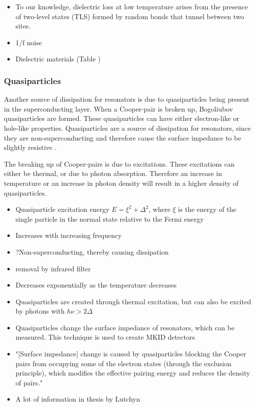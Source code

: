 \documentclass[12pt]{report}
\begin{document}
\begin{itemize}
    \item To our knowledge, dielectric loss at low temperature
        arises from the presence of two-level states (TLS) formed
        by random bonds that tunnel between two sites. \cite{martinis2014ucsb}
    \item 1/f noise \cite{burnett2013evidence}
    \item Dielectric materials (Table \cite{martinis2014ucsb})
\end{itemize}



\subsubsection{Quasiparticles}

Another source of dissipation for resonators is due to quasiparticles being present in the superconducting layer. When a Cooper-pair is broken up, Bogoliubov quasiparticles are formed. These quasiparticles can have either electron-like or hole-like properties. Quasiparticles are a source of dissipation for resonators, since they are non-superconducting and therefore cause the surface impedance to be slightly resistive \cite[p.~18]{Mazin}.

The breaking up of Cooper-pairs is due to excitations. These excitations can either be thermal, or due to photon absorption. Therefore an increase in temperature or an increase in photon density will result in a higher density of quasiparticles.

\begin{itemize}
    \item Quasiparticle excitation energy $E = \xi^2 + \Delta ^2$,
        where $\xi$ is the energy of the single particle in the normal state relative to the Fermi energy \cite{Barends}
    \item Increases with increasing frequency
    \item ?Non-superconducting, thereby causing dissipation
    \item removal by infrared filter
    \item Decreases exponentially as the temperature decreases \cite[p.~19?]{Mazin}
    \item Quasiparticles are created through thermal excitation, but can also be excited by photons with $h \nu > 2 \Delta$\cite{Gao}
    \item Quasiparticles change the surface impedance of resonators, which can be measured.
        This technique is used to create MKID detectors \cite{Gao}
    \item "[Surface impedance] change is caused by quasiparticles blocking
        the Cooper pairs from occupying some of the electron states (through the exclusion principle), which
        modifies the effective pairing energy and reduces the density of pairs."\cite[p.~3]{Mazin}
    \item A lot of information in thesis by Lutchyn \cite{Lutchyn}
\end{itemize}
\end{document}
